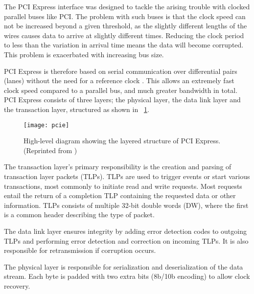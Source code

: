 The PCI Express interface was designed to tackle the arising trouble with clocked parallel buses like PCI.
The problem with such buses is that the clock speed can not be increased beyond a given threshold, as the slightly different lengths of the wires causes data to arrive at slightly different times.
Reducing the clock period to less than the variation in arrival time means the data will become corrupted.
This problem is exacerbated with increasing bus size.

PCI Express is therefore based on serial communication over differential pairs (lanes\footnotemark) without the need for a reference clock \cite{pcie}.
This allows an extremely fast clock speed compared to a parallel bus, and much greater bandwidth in total.
PCI Express consists of three layers; the physical layer, the data link layer and the transaction layer, structured as shown in \figurename~\ref{fig:pcie}.

\begin{figure}[!ht]
    \centering
    \texttt{[image: pcie]}
    \caption[PCI Express structure]{
        High-level diagram showing the layered structure of PCI Express. (Reprinted from \cite{pcie})
    }
    \label{fig:pcie}
\end{figure}

The transaction layer's primary responsibility is the creation and parsing of transaction layer packets (TLPs).
TLPs are used to trigger events or start various transactions, most commonly to initiate read and write requests\footnotemark.
Most requests entail the return of a completion TLP containing the requested data or other information.
TLPs consists of multiple 32-bit double words (DW), where the first is a common header describing the type of packet.

The data link layer ensures integrity by adding error detection codes to outgoing TLPs and performing error detection and correction on incoming TLPs.
It is also responsible for retransmission if corruption occurs.

The physical layer is responsible for serialization and deserialization of the data stream.
Each byte is padded with two extra bits (8b/10b encoding) to allow clock recovery.


